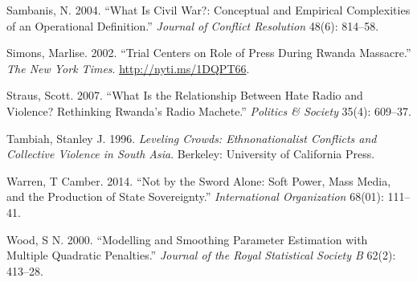 \documentclass[11pt,article,oneside]{memoir}
\begin{document}
Sambanis, N. 2004. ``What Is Civil War?: Conceptual and Empirical
Complexities of an Operational Definition.'' \emph{Journal of Conflict
Resolution} 48(6): 814--58.

Simons, Marlise. 2002. ``Trial Centers on Role of Press During Rwanda
Massacre.'' \emph{The New York Times}. \url{http://nyti.ms/1DQPT66}.

Straus, Scott. 2007. ``What Is the Relationship Between Hate Radio and
Violence? Rethinking Rwanda's Radio Machete.'' \emph{Politics \&
Society} 35(4): 609--37.

Tambiah, Stanley J. 1996. \emph{Leveling Crowds: Ethnonationalist
Conflicts and Collective Violence in South Asia}. Berkeley: University
of California Press.

Warren, T Camber. 2014. ``Not by the Sword Alone: Soft Power, Mass
Media, and the Production of State Sovereignty.'' \emph{International
Organization} 68(01): 111--41.

Wood, S N. 2000. ``Modelling and Smoothing Parameter Estimation with
Multiple Quadratic Penalties.'' \emph{Journal of the Royal Statistical
Society B} 62(2): 413--28.
\end{document}
